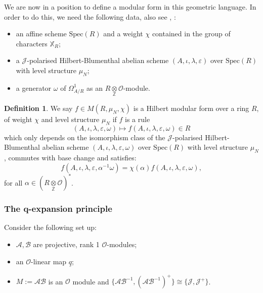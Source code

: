 \documentclass[a4paper,oneside]{amsart}
\theoremstyle{plain}
\theoremstyle{definition}
\newtheorem{define}[thm]{Definition}
\begin{document}
We are now in a position to define a modular form in this geometric language. In order to do this, we need the following data, also see \cite[\S5]{andreattagoren}, \cite[\S5]{goren}:
\begin{itemize}
    \item an affine scheme $\text{Spec}(R)$ and a weight $\chi$ contained in the group of characters $\mathbb{X}_R$;
    \item a $\mathcal{J}$-polarised Hilbert-Blumenthal abelian scheme $(A,\iota, \lambda, \varepsilon)$ over $\text{Spec}(R)$ with level structure $\mu_N$;
    \item a generator $\omega$ of $\Omega^1_{A/R}$ as an $R \underset{\mathbb{Z}}{\otimes} \mathcal{O}$-module.
\end{itemize}

\begin{define}
    We say $f \in M(R, \mu_N, \chi)$ is a Hilbert modular form over a ring $R$, of weight $\chi$ and level structure $\mu_N$ if $f$ is a rule
    \begin{equation*}
        (A, \iota, \lambda, \varepsilon, \omega) \mapsto f(A, \iota, \lambda, \varepsilon, \omega) \in R
    \end{equation*}
    which only depends on the isomorphism class of the $\mathcal{J}$-polarised Hilbert-Blumenthal abelian scheme $(A, \iota, \lambda, \varepsilon, \omega)$ over $\text{Spec}(R)$ with level structure $\mu_N$, commutes with base change and satisfies:
    \begin{equation*}
        f(A, \iota, \lambda, \varepsilon, \alpha^{-1}\omega) = \chi(\alpha)f(A, \iota, \lambda, \varepsilon, \omega),
    \end{equation*}
    for all $\alpha \in (R \underset{\mathbb{Z}}{\otimes} \mathcal{O})^*$.
\end{define}


\subsubsection{The q-expansion principle}
Consider the following set up:
\begin{itemize}
    \item $ \mathcal{A}, \mathcal{B}$ are projective, rank 1 $\mathcal{O}$-modules;
    \item an $\mathcal{O}$-linear map $\underline{q}$;
    \item $M:=\mathcal{AB}$ is an $\mathcal{O}$ module and $\{\mathcal{AB}^{-1}, (\mathcal{AB}^{-1})^+\} \cong \{\mathcal{J}, \mathcal{J}^+ \}$.
\end{itemize}
\end{document}
